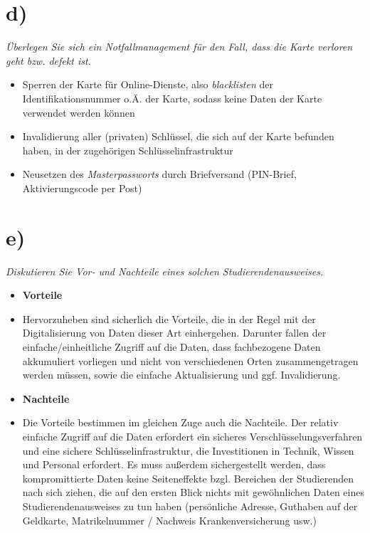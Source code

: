 \section{d)}

\textit{Überlegen Sie sich ein Notfallmanagement für den Fall, dass die Karte verloren geht bzw. defekt ist.}\\

\begin{itemize}
    \item Sperren der Karte für Online-Dienste, also \textit{blacklisten} der Identifikationsnummer o.Ä. der Karte, sodass keine Daten der Karte verwendet werden können
    \item Invalidierung aller (privaten) Schlüssel, die sich auf der Karte befunden haben, in der zugehörigen Schlüsselinfrastruktur
    \item Neusetzen des \textit{Masterpassworts} durch Briefversand (PIN-Brief, Aktivierungscode per Post)
\end{itemize}

\section{e)}

\textit{Diskutieren Sie Vor‐ und Nachteile eines solchen Studierendenausweises.}\\

\begin{itemize}
    \itemsep0.5em
    \item \textbf{Vorteile}
    \item[] Hervorzuheben sind sicherlich die Vorteile, die in der Regel mit der Digitalisierung von Daten dieser Art einhergehen.
    Darunter fallen der einfache/einheitliche Zugriff auf die Daten, dass fachbezogene Daten akkumuliert vorliegen und nicht von verschiedenen Orten zusammengetragen werden müssen, sowie die einfache Aktualisierung und ggf. Invalidierung.
    \item \textbf{Nachteile}
    \item[] Die Vorteile bestimmen im gleichen Zuge auch die Nachteile.
    Der relativ einfache Zugriff auf die Daten erfordert ein sicheres Verschlüsselungsverfahren und eine sichere Schlüsselinfrastruktur, die Investitionen in Technik, Wissen und Personal erfordert.
    Es muss außerdem sichergestellt werden, dass kompromittierte Daten keine Seiteneffekte bzgl. Bereichen der Studierenden nach sich ziehen, die auf den ersten Blick nichts mit gewöhnlichen Daten eines Studierendenausweises zu tun haben (persönliche Adresse, Guthaben auf der Geldkarte, Matrikelnummer / Nachweis Krankenversicherung usw.)
\end{itemize}

